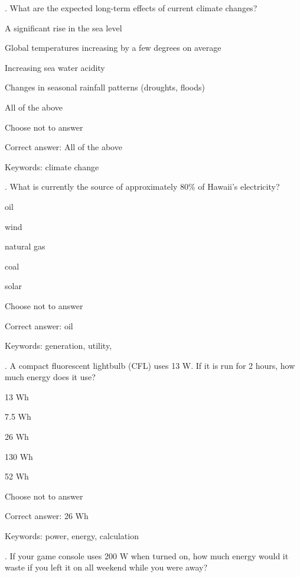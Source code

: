 . What are the expected long-term effects of current climate changes?

\begin{answer}
	\item A significant rise in the sea level
	\item Global temperatures increasing by a few degrees on average
	\item Increasing sea water acidity
	\item Changes in seasonal rainfall patterns (droughts, floods)
	\item All of the above
	\item Choose not to answer
\end{answer}

Correct answer: All of the above

Keywords: climate change

\vspace{5 mm}
. What is currently the source of approximately 80\% of Hawaii's electricity?

\begin{answer}
	\item oil
	\item wind
	\item natural gas
	\item coal
	\item solar
	\item Choose not to answer
\end{answer}

Correct answer: oil

Keywords: generation, utility, \Hawaii

\vspace{5 mm}
. A compact fluorescent lightbulb (CFL) uses 13 W. If it is run for 2 hours, how much energy does it use?

\begin{answer}
	\item 13 Wh
	\item 7.5 Wh
	\item 26 Wh
	\item 130 Wh
	\item 52 Wh
	\item Choose not to answer
\end{answer}

Correct answer: 26 Wh

Keywords: power, energy, calculation

\vspace{5 mm}
. If your game console uses 200 W when turned on, how much energy would it waste if you left it on all weekend while you were away?

